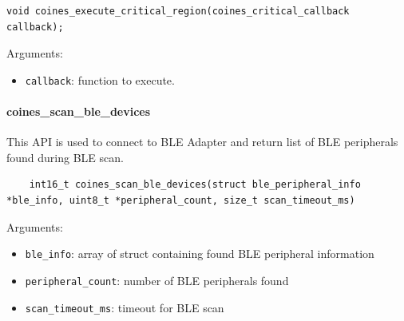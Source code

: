 \begin{lstlisting}
void coines_execute_critical_region(coines_critical_callback callback);
\end{lstlisting}

Arguments:
\begin{itemize}
	\item \texttt{callback}: function to execute.
\end{itemize}

\paragraph{coines\_scan\_ble\_devices}\label{coinesScanBleDevices}
This API is used to connect to BLE Adapter and return list of BLE peripherals found during BLE scan.

\begin{lstlisting}
	int16_t coines_scan_ble_devices(struct ble_peripheral_info *ble_info, uint8_t *peripheral_count, size_t scan_timeout_ms)
\end{lstlisting}

Arguments:
\begin{itemize}
	\item \texttt{ble\_info}: array of struct containing found BLE peripheral information
	\item \texttt{peripheral\_count}: number of BLE peripherals found
	\item \texttt{scan\_timeout\_ms}: timeout for BLE scan
\end{itemize}

\newpage

